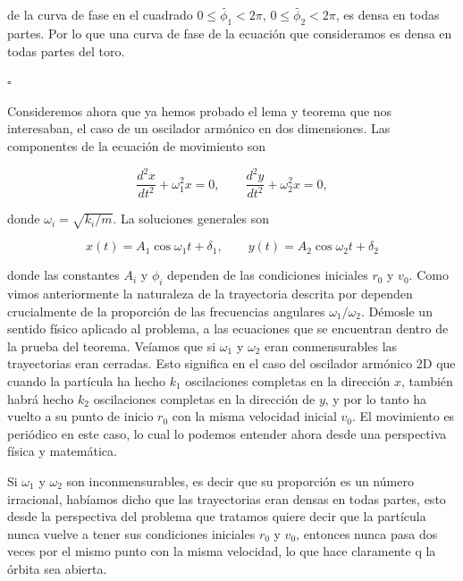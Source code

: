 \documentclass[a4paper,10pt]{article}
\numberwithin{equation}{section}
\begin{document}
de la curva de fase en el cuadrado $0 \leq \tilde{\phi_1} < 2\pi $, 
$0 \leq \tilde{\phi_2} < 2\pi $, es densa en todas partes. Por lo que 
una curva de fase de la ecuación que consideramos es densa en todas 
partes del toro.

\vspace{.2cm} \hspace{12cm} $\square$

Consideremos ahora que ya hemos probado el lema y teorema que nos interesaban,
el caso de un oscilador armónico en dos dimensiones. Las componentes de 
la ecuación de movimiento son

\begin{equation}
 \frac{d^2x}{dt^2} + \omega_1^2 x = 0, \qquad \frac{d^2y}{dt^2} + \omega_2^2 x = 0,
\end{equation}

donde $\omega_i = \sqrt{k_i/m}$. La soluciones generales son

\begin{equation}
 x(t) = A_1 \cos{\omega_1 t + \delta_1}, \qquad y(t) = A_2 \cos{\omega_2 t + \delta_2}
\label{eq:solOsci2D}
\end{equation}

donde las constantes $A_i$ y $\phi_i$ dependen de las condiciones iniciales 
$r_0$ y $v_0$. Como vimos anteriormente la naturaleza de la trayectoria descrita 
por  dependen crucialmente de la proporción de las frecuencias 
angulares $\omega_1/\omega_2$. Démosle un sentido físico aplicado al problema, a las 
ecuaciones que se encuentran dentro de la prueba del teorema. Veíamos que 
si $\omega_1$ y $\omega_2$ eran conmensurables las trayectorias eran cerradas. Esto
significa en el caso del oscilador armónico 2D que cuando la partícula 
ha hecho $k_1$ oscilaciones completas en la dirección $x$, también
habrá hecho $k_2$ oscilaciones completas en la dirección de $y$, y por 
lo tanto ha vuelto a su punto de inicio $r_0$ con la misma velocidad inicial 
$v_0$. El movimiento es periódico en este caso, lo cual lo podemos entender ahora
desde una perspectiva física y matemática.

Si $\omega_1$ y $\omega_2$ son inconmensurables, es decir que su proporción 
es un número irracional, habíamos dicho que las trayectorias eran densas 
en todas partes, esto desde la perspectiva del problema que tratamos quiere decir 
que la partícula nunca vuelve a tener sus condiciones iniciales $r_0$ y $v_0$,
entonces nunca pasa dos veces por el mismo punto con la misma velocidad, lo 
que hace claramente q la órbita sea abierta.
\end{document}
